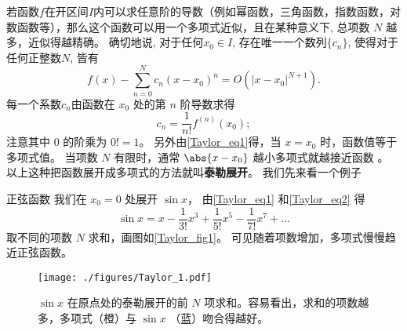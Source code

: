 

若函数$f$在开区间$I$内可以求任意阶的导数（例如幂函数，三角函数，指数函数，对数函数等），那么这个函数可以用一个多项式近似，且在某种意义下, 总项数 $N$ 越多，近似得越精确。 确切地说, 对于任何$x_0\in I$, 存在唯一一个数列$\{c_n\}$, 使得对于任何正整数$N$, 皆有
\begin{equation}\label{Taylor_eq1}
f(x) -\sum_{n = 0}^N  c_n (x - x_0)^n=O(|x-x_0|^{N+1}).
\end{equation}
每一个系数$c_n$由函数在 $x_0$ 处的第 $n$ 阶导数求得
\begin{equation}\label{Taylor_eq2}
c_n = \frac{1}{n!} f^{(n)}(x_0);
\end{equation}
注意其中 0 的阶乘为 $0! = 1$。 另外由\autoref{Taylor_eq1}得，当 $x=x_0$ 时，函数值等于多项式值。 当项数 $N$ 有限时，通常 $\abs{x-x_0}$ 越小多项式就越接近函数 。 以上这种把函数展开成多项式的方法就叫\textbf{泰勒展开}。 我们先来看一个例子

\begin{example}{正弦函数}
我们在 $x_0=0$ 处展开 $\sin x$， 由\autoref{Taylor_eq1} 和\autoref{Taylor_eq2} 得
\begin{equation}\label{Taylor_eq3}
\sin x = x - \frac{1}{3!}{x^3} + \frac{1}{5!}{x^5} - \frac{1}{7!} x^7 + \ldots 
\end{equation}
取不同的项数 $N$ 求和，画图如\autoref{Taylor_fig1}。 可见随着项数增加，多项式慢慢趋近正弦函数。

\begin{figure}[ht]
\centering
\texttt{[image: ./figures/Taylor\_1.pdf]}
\caption{$\sin x$ 在原点处的泰勒展开的前 $N$ 项求和。容易看出，求和的项数越多，多项式（橙）与 $\sin x$ （蓝）吻合得越好。}\label{Taylor_fig1}
\end{figure}
\end{example}

